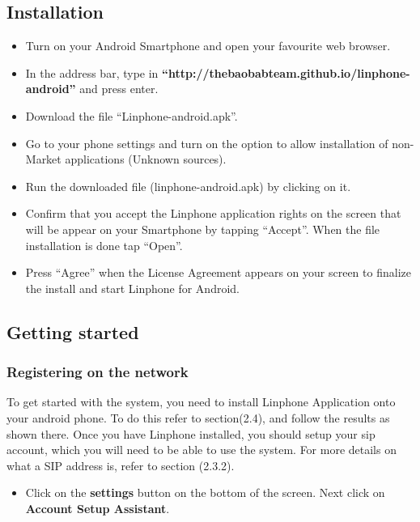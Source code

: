 \documentclass[a4paper]{article}
\begin{document}
\subsection{Installation}
\begin{itemize}
\item Turn on your Android Smartphone and open your favourite web browser.
\item In the address bar, type in \textbf{“http://thebaobabteam.github.io/linphone-android”} and press enter.
\item Download the file “Linphone-android.apk”.
\item Go to your phone settings and turn on the option to allow installation of non-Market applications (Unknown sources).
\item Run the downloaded file (linphone-android.apk) by clicking on it.
\item Confirm that you accept the Linphone application rights on the screen that will be appear on your Smartphone by tapping “Accept”. When the file installation is done tap “Open”.
\item Press “Agree” when the License Agreement appears on your screen to finalize the install and start Linphone for Android.
\end{itemize}

\subsection{Getting started}

\subsubsection{Registering on the network}
To get started with the system, you need to install Linphone Application onto your android phone. To do this refer to section(2.4), and follow the results as shown there.
Once you have Linphone installed, you should setup your sip account, which you will need to be able to use the system. For more details on what a SIP address is, refer to section (2.3.2).
\begin{itemize}
\item Click on the \textbf{settings} button on the bottom of the screen. Next click on  \textbf{Account Setup Assistant}.
\end{itemize}
\end{document}
